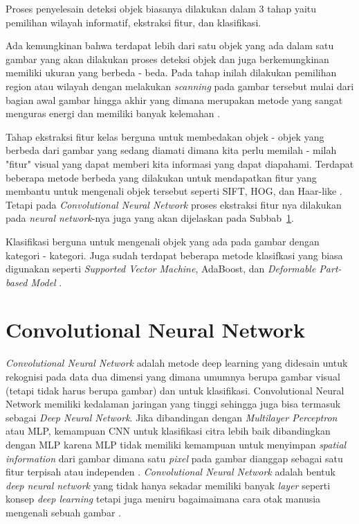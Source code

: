 \par Proses penyelesain deteksi objek biasanya dilakukan dalam 3 tahap yaitu pemilihan wilayah informatif, ekstraksi fitur, dan
klasifikasi.

\par Ada kemungkinan bahwa terdapat lebih dari satu objek yang ada dalam satu gambar yang akan dilakukan proses deteksi objek dan
juga berkemungkinan memiliki ukuran yang berbeda - beda. Pada tahap inilah dilakukan pemilihan region atau wilayah dengan melakukan \emph{scanning} pada gambar tersebut mulai
dari bagian awal gambar hingga akhir yang dimana merupakan metode yang sangat menguras energi dan memiliki banyak kelemahan \cite{zhao2019object}.

\par Tahap ekstraksi fitur kelas berguna untuk membedakan objek - objek yang berbeda dari gambar yang sedang diamati dimana kita perlu
memilah - milah "fitur" visual yang dapat memberi kita informasi yang dapat diapahami. Terdapat beberapa metode berbeda yang dilakukan
untuk mendapatkan fitur yang membantu untuk mengenali objek tersebut seperti SIFT, HOG, dan Haar-like \cite{zhao2019object}. Tetapi pada \emph{Convolutional Neural Network}
proses ekstraksi fitur nya dilakukan pada \emph{neural network}-nya juga yang akan dijelaskan pada Subbab~\ref{sec:convolutionalneuralnetwork}.

\par Klasifikasi berguna untuk mengenali objek yang ada pada gambar dengan kategori - kategori. Juga sudah terdapat beberapa metode
klasifkasi yang biasa digunakan seperti \emph{Supported Vector Machine}, AdaBoost, dan \emph{Deformable Part-based Model} \cite{zhao2019object}. 


\section{Convolutional Neural Network}
\label{sec:convolutionalneuralnetwork}

\par \emph{Convolutional Neural Network} adalah metode deep learning yang didesain untuk rekognisi pada data dua 
dimensi yang dimana umumnya berupa gambar visual (tetapi tidak harus berupa gambar) dan untuk klasifikasi.
Convolutional Neural Network memiliki kedalaman jaringan yang tinggi sehingga juga bisa termasuk sebagai \emph{Deep Neural Network}.
Jika dibandingan dengan \emph{Multilayer Perceptron} atau MLP, kemampuan CNN untuk klasifikasi citra lebih baik dibandingkan dengan MLP karena MLP tidak memiliki
kemampuan untuk menyimpan \emph{spatial information} dari gambar dimana satu \emph{pixel} pada gambar dianggap sebagai satu fitur
terpisah atau independen \cite{putra2016klasifikasi}. \emph{Convolutional Neural Network} adalah bentuk \emph{deep neural network} yang tidak hanya
sekadar memiliki banyak \emph{layer} seperti konsep \emph{deep learning} tetapi juga meniru bagaimaimana cara otak manusia mengenali sebuah gambar \cite{kim2017convolutional}.

